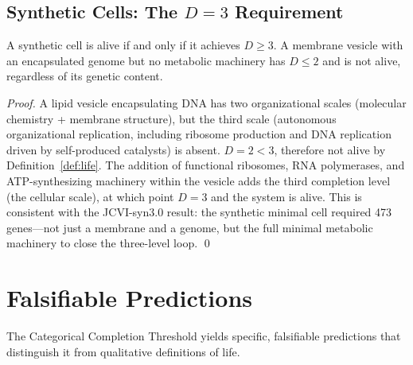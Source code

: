\subsection{Synthetic Cells: The $D = 3$ Requirement}

\begin{corollary}
\label{cor:synthetic_cell}
A synthetic cell is alive if and only if it achieves $D \geq 3$. A membrane
vesicle with an encapsulated genome but no metabolic machinery has $D \leq 2$
and is not alive, regardless of its genetic content.
\end{corollary}

\begin{proof}
A lipid vesicle encapsulating DNA has two organizational scales (molecular
chemistry + membrane structure), but the third scale (autonomous organizational
replication, including ribosome production and DNA replication driven by
self-produced catalysts) is absent. $D = 2 < 3$, therefore not alive by
Definition~\ref{def:life}. The addition of functional ribosomes, RNA polymerases,
and ATP-synthesizing machinery within the vesicle adds the third completion level
(the cellular scale), at which point $D = 3$ and the system is alive. This is
consistent with the JCVI-syn3.0 result: the synthetic minimal cell required
473 genes---not just a membrane and a genome, but the full minimal metabolic
machinery to close the three-level loop. \qed
\end{proof}

\section{Falsifiable Predictions}
\label{sec:life_predictions}

The Categorical Completion Threshold yields specific, falsifiable predictions
that distinguish it from qualitative definitions of life.


